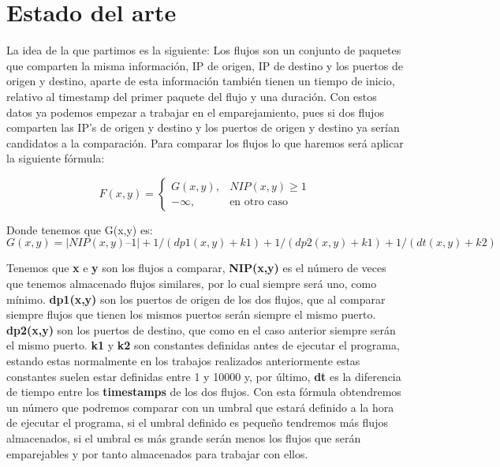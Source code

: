 \chapter{Estado del arte}

La idea de la que partimos es la siguiente: 
Los flujos son un conjunto de paquetes que comparten la misma 
información, IP de origen, IP de destino y los puertos de origen 
y destino, aparte de esta información también tienen un tiempo de 
inicio, relativo al timestamp del primer paquete del flujo y una 
duración. Con estos datos ya podemos empezar a trabajar en el 
emparejamiento, pues si dos flujos comparten las IP’s de origen y 
destino y los puertos de origen y destino ya serían candidatos a 
la comparación. 
\intro
Para comparar los flujos lo que haremos será aplicar la siguiente 
fórmula:
\intro

\begin{equation*}
	F(x,y)=
 	\begin{cases}
	  G(x,y), & NIP(x,y) \geq 1 \\
	  -\infty, & \text{en otro caso}
	 \end{cases}
\end{equation*}

Donde tenemos que G(x,y) es:
\intro
\begin{displaymath}
G(x,y) = |NIP(x,y) – 1| + 1 / (dp1(x,y) + k1) + 1 / (dp2(x,y) + k1) + 1 / (dt(x,y) + k2)
\end{displaymath}

Tenemos que \textbf{x} e \textbf{y} son los flujos a comparar, \textbf{NIP(x,y)} es el número 
de veces que tenemos almacenado flujos similares, por lo cual siempre 
será uno, como mínimo. \textbf{dp1(x,y)} son los puertos de origen de los dos 
flujos, que al comparar siempre flujos que tienen los mismos puertos serán siempre el mismo puerto.
\textbf{dp2(x,y)} son los puertos de destino, que como en el caso anterior siempre serán el mismo puerto.
\textbf{k1} y \textbf{k2} son constantes definidas antes de ejecutar el programa, 
estando estas normalmente en los trabajos realizados anteriormente estas constantes suelen estar 
definidas entre 1 y 10000 y, por último, \textbf{dt} es la diferencia de tiempo entre 
los \textbf{timestamps} de los dos flujos.
\intro
Con esta fórmula obtendremos un número que podremos comparar con un 
umbral que estará definido a la hora de ejecutar el programa, si el umbral 
definido es pequeño tendremos más flujos almacenados, si el umbral es más grande serán 
menos los flujos que serán emparejables y por tanto almacenados para trabajar con ellos. \cite{comparacion}


